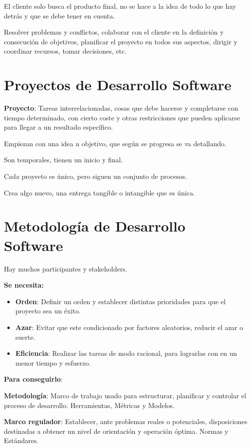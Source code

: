 \documentclass[12pt, twoside, openright]{report} %
\begin{document}
El cliente solo busca el producto final, no se hace a la idea de todo lo
que hay detrás y que se debe tener en cuenta.

Resolver problemas y conflictos, colaborar con el cliente en la
definición y consecución de objetivos, planificar el proyecto en todos
sus aspectos, dirigir y coordinar recursos, tomar decisiones, etc.

\section{Proyectos de Desarrollo Software}

\textbf{Proyecto}: Tareas interrelacionadas, cosas que debe hacerse y
completarse con tiempo determinado, con cierto coste y otras
restricciones que pueden aplicarse para llegar a un resultado
específico.

Empiezan con una idea u objetivo, que según se progresa se va
detallando.

Son temporales, tienen un inicio y final.

Cada proyecto es único, pero siguen un conjunto de procesos.

Crea algo nuevo, una entrega tangible o intangible que es única.

\section{Metodología de Desarrollo
Software}

Hay muchos participantes y stakeholders.

\textbf{Se necesita:}

\begin{itemize}

\item
  \textbf{Orden}: Definir un orden y establecer distintas prioridades
  para que el proyecto sea un éxito.
\item
  \textbf{Azar}: Evitar que este condicionado por factores aleatorios,
  reducir el azar o suerte.
\item
  \textbf{Eficiencia}: Realizar las tareas de modo racional, para
  lograrlas con en un menor tiempo y esfuerzo.
\end{itemize}

\textbf{Para conseguirlo}:

\textbf{Metodología}: Marco de trabajo usado para estructurar,
planificar y controlar el proceso de desarrollo. Herramientas, Métricas
y Modelos.

\textbf{Marco regulador}: Establecer, ante problemas reales o
potenciales, disposiciones destinadas a obtener un nivel de orientación
y operación óptima. Normas y Estándares.
\end{document}
